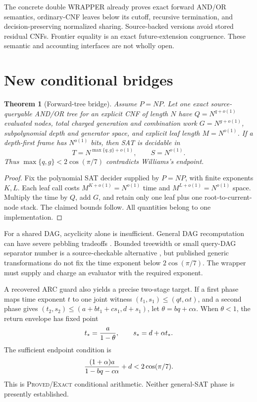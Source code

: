 \documentclass[11pt]{article}
\newtheorem{theorem}{Theorem}
\newcommand{\gammaTS}{2\cos(\pi/7)}
\begin{document}
The concrete double WRAPPER already proves exact forward AND/OR semantics,
ordinary-CNF leaves below its cutoff, recursive termination, and
decision-preserving normalized sharing.  Source-backed versions avoid stored
residual CNFs.  Frontier equality is an exact future-extension congruence.
These semantic and accounting interfaces are not wholly open.

\section{New conditional bridges}
\begin{theorem}[Forward-tree bridge]
Assume $P=NP$.  Let one exact source-queryable AND/OR tree for an explicit
CNF of length $N$ have $Q=N^{q+o(1)}$ evaluated nodes, total charged
generation and combination work $G=N^{g+o(1)}$, subpolynomial depth and
generator space, and explicit leaf length $M=N^{o(1)}$.  If a depth-first
frame has $N^{o(1)}$ bits, then SAT is decidable in
\[
 T=N^{\max\{q,g\}+o(1)},\qquad S=N^{o(1)}.
\]
Thus $\max\{q,g\}<\gammaTS$ contradicts Williams's endpoint.
\end{theorem}
\begin{proof}
Fix the polynomial SAT decider supplied by $P=NP$, with finite exponents
$K,L$.  Each leaf call costs $M^{K+o(1)}=N^{o(1)}$ time and
$M^{L+o(1)}=N^{o(1)}$ space.  Multiply the time by $Q$, add $G$, and retain
only one leaf plus one root-to-current-node stack.  The claimed bounds
follow.  All quantities belong to one implementation.
\end{proof}

For a shared DAG, acyclicity alone is insufficient.  General DAG
recomputation can have severe pebbling tradeoffs \cite{paultarjan}.
Bounded treewidth or small query-DAG separator number is a source-checkable
alternative \cite{jansensarma,gharibianrudolph}, but published generic
transformations do not fix the time exponent below $\gammaTS$.  The wrapper
must supply and charge an evaluator with the required exponent.

A recovered ARC guard also yields a precise two-stage target.  If a first
phase maps time exponent $t$ to one joint witness
$(t_1,s_1)\le(qt,\alpha t)$, and a second phase gives
$(t_2,s_2)\le(a+bt_1+cs_1,d+s_1)$, let
$\theta=bq+c\alpha$.  When $\theta<1$, the return envelope has fixed point
\[
 t_*={a\over1-\theta},\qquad s_*=d+\alpha t_*.
\]
The sufficient endpoint condition is
\[
 { (1+\alpha)a\over1-bq-c\alpha}+d<\gammaTS.
\]
This is \textsc{Proved/Exact} conditional arithmetic.  Neither general-SAT
phase is presently established.
\end{document}
